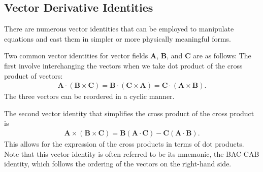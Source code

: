 \subsection{Vector Derivative Identities}

There are numerous vector identities that can be employed to manipulate equations and cast them in simpler or more physically meaningful forms.

Two common vector identities for vector fields $\mathbf{A}$, $\mathbf{B}$, and $\mathbf{C}$ are as follows: The first involve interchanging the vectors when we take dot product of the cross product of vectors:
\begin{align}
  \mathbf{A} \cdot ( \mathbf{B} \times \mathbf{C} ) = \mathbf{B} \cdot ( \mathbf{C} \times \mathbf{A} ) = \mathbf{C} \cdot ( \mathbf{A} \times \mathbf{B} ) .
\end{align}
The three vectors can be reordered in a cyclic manner. 

The second vector identity that simplifies the cross product of the cross product is
\begin{align}
\mathbf{A} \times ( \mathbf{B} \times \mathbf{C} ) = \mathbf{B} ( \mathbf{A} \cdot \mathbf{C} ) - \mathbf{C} ( \mathbf{A} \cdot \mathbf{B} ) .
\end{align}
This allows for the expression of the cross products in terms of dot products. Note that this vector identity is often referred to be its mnemonic, the BAC-CAB identity, which follows the ordering of the vectors on the right-hand side.

